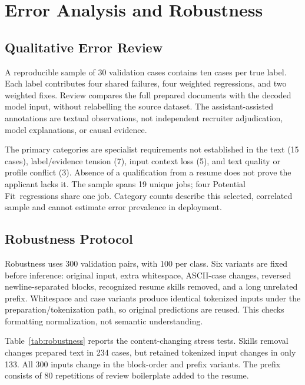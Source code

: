 \documentclass[conference,a4paper]{IEEEtran}
\newcommand{\PF}{Potential Fit}
\begin{document}
\section{Error Analysis and Robustness}
\subsection{Qualitative Error Review}
A reproducible sample of 30 validation cases contains ten cases per true label. Each label contributes four shared failures, four weighted regressions, and two weighted fixes. Review compares the full prepared documents with the decoded model input, without relabelling the source dataset. The assistant-assisted annotations are textual observations, not independent recruiter adjudication, model explanations, or causal evidence.

The primary categories are specialist requirements not established in the text (15 cases), label/evidence tension (7), input context loss (5), and text quality or profile conflict (3). Absence of a qualification from a resume does not prove the applicant lacks it. The sample spans 19 unique jobs; four \PF\ regressions share one job. Category counts describe this selected, correlated sample and cannot estimate error prevalence in deployment.

\subsection{Robustness Protocol}
Robustness uses 300 validation pairs, with 100 per class. Six variants are fixed before inference: original input, extra whitespace, ASCII-case changes, reversed newline-separated blocks, recognized resume skills removed, and a long unrelated prefix. Whitespace and case variants produce identical tokenized inputs under the preparation/tokenization path, so original predictions are reused. This checks formatting normalization, not semantic understanding.

Table~\ref{tab:robustness} reports the content-changing stress tests. Skills removal changes prepared text in 234 cases, but retained tokenized input changes in only 133. All 300 inputs change in the block-order and prefix variants. The prefix consists of 80 repetitions of review boilerplate added to the resume.
\end{document}
